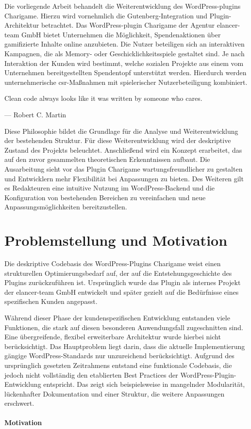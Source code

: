 Die vorliegende Arbeit behandelt die Weiterentwicklung des WordPress-\gls{plugin}s Charigame.
Hierzu wird vornehmlich die Gutenberg-Integration und Plugin-Architektur betrachtet.
Das WordPress-\gls{plugin} Charigame der Agentur elancer-team GmbH bietet Unternehmen die Möglichkeit, Spendenaktionen über gamifizierte Inhalte online anzubieten.
Die Nutzer beteiligen sich an interaktiven Kampagnen, die als Memory- oder Geschicklichkeitsspiele gestaltet sind.
Je nach Interaktion der Kunden wird bestimmt, welche sozialen Projekte aus einem vom Unternehmen bereitgestellten Spendentopf unterstützt werden.
Hierdurch werden unternehmerische \gls{csr}-Maßnahmen mit spielerischer Nutzerbeteiligung kombiniert.

\epigraph{ \glqq Clean code always looks like it was written by someone who cares.\grqq{}}{--- \textup{Robert C. Martin}}

Diese Philosophie bildet die Grundlage für die Analyse und Weiterentwicklung der bestehenden Struktur.
Für diese Weiterentwicklung wird der deskriptive Zustand des Projekts beleuchtet.
Anschließend wird ein Konzept erarbeitet, das auf den zuvor gesammelten theoretischen Erkenntnissen aufbaut.
Die Ausarbeitung sieht vor das Plugin Charigame wartungsfreundlicher zu gestalten und Entwicklern mehr Flexibilität bei Anpassungen zu bieten.
Des Weiteren gilt es Redakteuren eine intuitive Nutzung im WordPress-Backend und die Konfiguration von bestehenden Bereichen zu vereinfachen und neue Anpassungsmöglichkeiten bereitzustellen.

\section{Problemstellung und Motivation}

Die deskriptive Codebasis des WordPress-Plugins Charigame weist einen strukturellen Optimierungsbedarf auf, der auf die Entstehungsgeschichte des Plugins zurückzuführen ist.
Ursprünglich wurde das Plugin als internes Projekt der elancer-team GmbH entwickelt und später gezielt auf die Bedürfnisse eines spezifischen Kunden angepasst.

Während dieser Phase der kundenspezifischen Entwicklung entstanden viele Funktionen, die stark auf diesen besonderen Anwendungsfall zugeschnitten sind.
Eine übergreifende, flexibel erweiterbare Architektur wurde hierbei nicht berücksichtigt.
Das Hauptproblem liegt darin, dass die aktuelle Implementierung gängige WordPress-Standards nur unzureichend berücksichtigt.
Aufgrund des ursprünglich gesetzten Zeitrahmens entstand eine funktionale Codebasis, die jedoch nicht vollständig den etablierten Best Practices der WordPress-Plugin-Entwicklung entspricht.
Das zeigt sich beispielsweise in mangelnder Modularität, lückenhafter Dokumentation und einer Struktur, die weitere Anpassungen erschwert.
\\\\
\textbf{Motivation}

